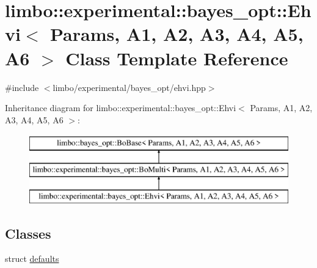\hypertarget{classlimbo_1_1experimental_1_1bayes__opt_1_1_ehvi}{}\section{limbo\+:\+:experimental\+:\+:bayes\+\_\+opt\+:\+:Ehvi$<$ Params, A1, A2, A3, A4, A5, A6 $>$ Class Template Reference}
\label{classlimbo_1_1experimental_1_1bayes__opt_1_1_ehvi}


{\ttfamily \#include $<$limbo/experimental/bayes\+\_\+opt/ehvi.\+hpp$>$}

Inheritance diagram for limbo\+:\+:experimental\+:\+:bayes\+\_\+opt\+:\+:Ehvi$<$ Params, A1, A2, A3, A4, A5, A6 $>$\+:\begin{figure}[H]
\begin{center}
\leavevmode
\includegraphics[height=3.000000cm]{classlimbo_1_1experimental_1_1bayes__opt_1_1_ehvi}
\end{center}
\end{figure}
\subsection*{Classes}
\begin{DoxyCompactItemize}
\item 
struct \hyperlink{structlimbo_1_1experimental_1_1bayes__opt_1_1_ehvi_1_1defaults}{defaults}
\end{DoxyCompactItemize}
